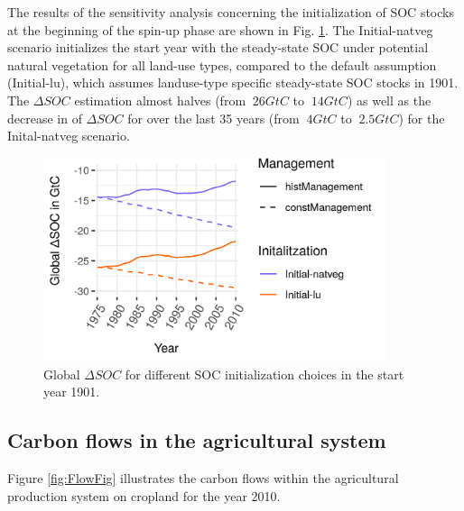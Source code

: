 \documentclass[gc, manuscript]{copernicus}
\begin{document}
The results of the sensitivity analysis concerning the initialization of SOC stocks at the beginning of the spin-up phase are shown in Fig. \ref{fig:SOCinit}. The Initial-natveg scenario initializes the start year with the steady-state SOC under potential natural vegetation for all land-use types, compared to the default assumption (Initial-lu), which assumes landuse-type specific steady-state SOC stocks in 1901. The \(\Delta SOC\) estimation almost halves (from \(~26\unit{GtC}\) to \(~14\unit{GtC}\)) as well as the decrease in of \(\Delta SOC\) for over the last 35 years (from \(~4\unit{GtC}\) to \(~2.5\unit{GtC}\)) for the Inital-natveg scenario.

\begin{figure}
\includegraphics[width=10cm]{../ResultNotebooks/Output/Images/scenario_init} \caption{Global $\Delta SOC$ for different SOC initialization choices in the start year 1901.}\label{fig:SOCinit}
\end{figure}

\hypertarget{carbon-flows-in-the-agricultural-system}{%
\subsection{Carbon flows in the agricultural system}\label{carbon-flows-in-the-agricultural-system}}

Figure \ref{fig:FlowFig} illustrates the carbon flows within the agricultural production system on cropland for the year 2010.
\end{document}
